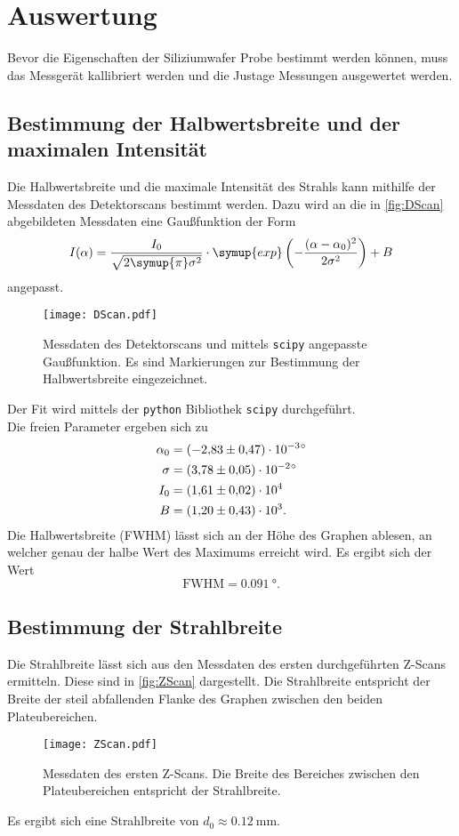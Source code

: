 \section{Auswertung}
\label{sec:Auswertung}
Bevor die Eigenschaften der Siliziumwafer Probe bestimmt werden können, muss das Messgerät kallibriert werden und die Justage Messungen ausgewertet werden.
\subsection{Bestimmung der Halbwertsbreite und der maximalen Intensität}
Die Halbwertsbreite und die maximale Intensität des Strahls kann mithilfe der Messdaten des Detektorscans bestimmt werden.
Dazu wird an die in \autoref{fig:DScan} abgebildeten Messdaten eine Gaußfunktion der Form
\begin{equation*}
  I(\alpha) = \frac{I_0}{\sqrt{2\symup{\pi}\sigma^2}}\cdot \symup{exp}\left(-\frac{(\alpha - \alpha_0)^2}{2\sigma^2}\right) + B
\end{equation*} 
angepasst. 
\begin{figure}
  \centering
  \texttt{[image: DScan.pdf]}
  \caption{Messdaten des Detektorscans und mittels \texttt{scipy} \cite{scipy} angepasste Gaußfunktion. Es sind Markierungen zur Bestimmung der Halbwertsbreite eingezeichnet.}
  \label{fig:DScan}
\end{figure}
Der Fit wird mittels der \texttt{python} Bibliothek \texttt{scipy} \cite{scipy} durchgeführt. \\
Die freien Parameter ergeben sich zu
\begin{align*}
  \alpha_0 &= \qty{-2.83 +-0.47e-3}{\degree} \\
  \sigma &= \qty{3.78 +- 0.05e-2}{\degree} \\
  I_0 &= \num{1.61 +- 0.02e4} \\
  B &= \num{1.20 +- 0.43e3}.
\end{align*}
Die Halbwertsbreite (FWHM) lässt sich an der Höhe des Graphen ablesen, an welcher genau der halbe Wert des Maximums erreicht wird. 
Es ergibt sich der Wert 
\begin{equation*}
  \text{FWHM} = \qty{0.091}{\degree}.
\end{equation*}

\subsection{Bestimmung der Strahlbreite}
Die Strahlbreite lässt sich aus den Messdaten des ersten durchgeführten Z-Scans ermitteln. Diese sind in \autoref{fig:ZScan} dargestellt.
Die Strahlbreite entspricht der Breite der steil abfallenden Flanke des Graphen zwischen den beiden Plateubereichen.
\begin{figure}
  \centering
  \texttt{[image: ZScan.pdf]}
  \caption{Messdaten des ersten Z-Scans. Die Breite des Bereiches zwischen den Plateubereichen entspricht der Strahlbreite.}
  \label{fig:ZScan}
\end{figure}
Es ergibt sich eine Strahlbreite von $d_0 \approx \qty{0.12}{\milli\metre}$. 

